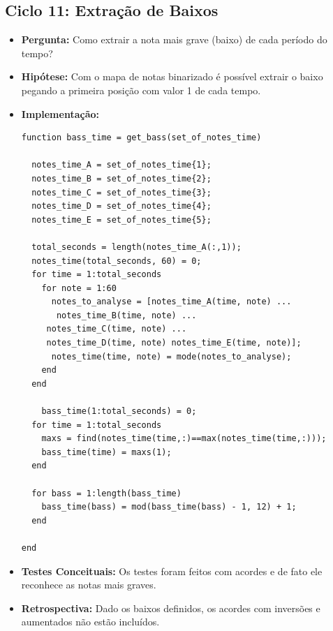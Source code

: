 \subsection{Ciclo 11: Extração de Baixos}
\label{subsec:ciclo_11}
\begin{itemize}
\item \textbf{Pergunta:} Como extrair a nota mais grave (baixo) de cada período do tempo?
\item \textbf{Hipótese:} Com o mapa de notas binarizado é possível extrair o baixo pegando a primeira posição com valor 1 de cada tempo.
\item \textbf{Implementação:}
\begin{lstlisting}
function bass_time = get_bass(set_of_notes_time)

  notes_time_A = set_of_notes_time{1};
  notes_time_B = set_of_notes_time{2};
  notes_time_C = set_of_notes_time{3};
  notes_time_D = set_of_notes_time{4};
  notes_time_E = set_of_notes_time{5};

  total_seconds = length(notes_time_A(:,1));
  notes_time(total_seconds, 60) = 0;
  for time = 1:total_seconds
    for note = 1:60
      notes_to_analyse = [notes_time_A(time, note) ...
       notes_time_B(time, note) ...
     notes_time_C(time, note) ...
     notes_time_D(time, note) notes_time_E(time, note)];
      notes_time(time, note) = mode(notes_to_analyse);
    end
  end

    bass_time(1:total_seconds) = 0;
  for time = 1:total_seconds
    maxs = find(notes_time(time,:)==max(notes_time(time,:)));
    bass_time(time) = maxs(1);
  end

  for bass = 1:length(bass_time)
    bass_time(bass) = mod(bass_time(bass) - 1, 12) + 1;
  end

end
\end{lstlisting}
\item \textbf{Testes Conceituais:} Os testes foram feitos com acordes e de fato ele reconhece as notas mais graves.
\item \textbf{Retrospectiva:} Dado os baixos definidos, os acordes com inversões e aumentados não estão incluídos.
\end{itemize}


